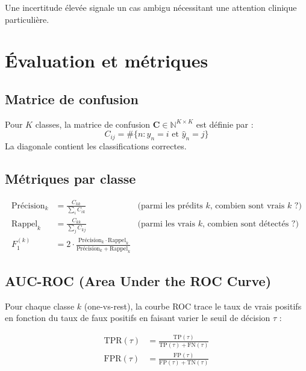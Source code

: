 \documentclass[11pt,a4paper]{article}
\newcommand{\N}{\mathbb{N}}
\begin{document}
Une incertitude élevée signale un cas ambigu nécessitant une attention clinique particulière.

\section{Évaluation et métriques}

\subsection{Matrice de confusion}

Pour $K$ classes, la matrice de confusion $\mathbf{C} \in \N^{K \times K}$ est définie par :
\begin{equation}
  C_{ij} = \#\{n : y_n = i \text{ et } \hat{y}_n = j\}
\end{equation}
La diagonale contient les classifications correctes.

\subsection{Métriques par classe}

\begin{align}
  \text{Précision}_k &= \frac{C_{kk}}{\sum_{i} C_{ik}} & \text{(parmi les prédits $k$, combien sont vrais $k$ ?)} \\[6pt]
  \text{Rappel}_k &= \frac{C_{kk}}{\sum_{j} C_{kj}} & \text{(parmi les vrais $k$, combien sont détectés ?)} \\[6pt]
  F_1^{(k)} &= 2 \cdot \frac{\text{Précision}_k \cdot \text{Rappel}_k}{\text{Précision}_k + \text{Rappel}_k}
\end{align}

\subsection{AUC-ROC (Area Under the ROC Curve)}

Pour chaque classe $k$ (one-vs-rest), la courbe ROC trace le taux de vrais positifs en fonction du taux de faux positifs en faisant varier le seuil de décision $\tau$ :

\begin{align}
  \text{TPR}(\tau) &= \frac{\text{TP}(\tau)}{\text{TP}(\tau) + \text{FN}(\tau)} \\[4pt]
  \text{FPR}(\tau) &= \frac{\text{FP}(\tau)}{\text{FP}(\tau) + \text{TN}(\tau)}
\end{align}
\end{document}

